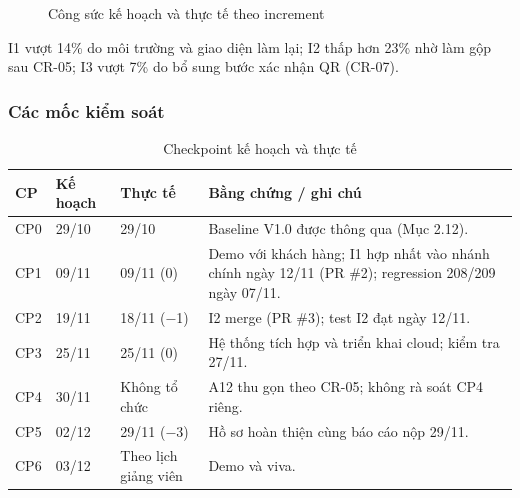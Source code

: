 \begin{figure}[H]
\centering
{}
\vspace{6pt}
\caption{Công sức kế hoạch và thực tế theo increment}\label{fig:t4-increments}
\end{figure}

I1 vượt 14\% do môi trường và giao diện làm lại; I2 thấp hơn 23\% nhờ làm gộp sau CR-05; I3 vượt 7\% do bổ sung bước xác nhận QR (CR-07).

\subsubsection{Các mốc kiểm soát}

\begin{table}[H]
\centering\small
\caption{Checkpoint kế hoạch và thực tế}\label{tab:t4-checkpoints}
\begin{tabularx}{\linewidth}{@{}p{.08\linewidth}p{.13\linewidth}p{.20\linewidth}X@{}}
\toprule
\textbf{CP} & \textbf{Kế hoạch} & \textbf{Thực tế} & \textbf{Bằng chứng / ghi chú}\\\midrule
CP0 & 29/10 & 29/10 & Baseline V1.0 được thông qua (Mục 2.12).\\
CP1 & 09/11 & 09/11 (0) & Demo với khách hàng; I1 hợp nhất vào nhánh chính ngày 12/11 (PR \#2); regression 208/209 ngày 07/11.\\
CP2 & 19/11 & 18/11 ($-$1) & I2 merge (PR \#3); test I2 đạt ngày 12/11.\\
CP3 & 25/11 & 25/11 (0) & Hệ thống tích hợp và triển khai cloud; kiểm tra 27/11.\\
CP4 & 30/11 & Không tổ chức & A12 thu gọn theo CR-05; không rà soát CP4 riêng.\\
CP5 & 02/12 & 29/11 ($-$3) & Hồ sơ hoàn thiện cùng báo cáo nộp 29/11.\\
CP6 & 03/12 & Theo lịch giảng viên & Demo và viva.\\
\bottomrule
\end{tabularx}
\end{table}

